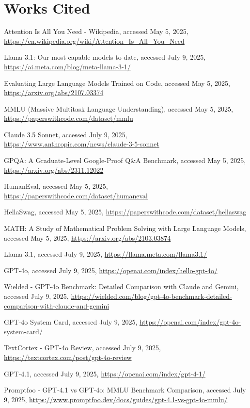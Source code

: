 \documentclass[12pt, a4paper]{article}
\begin{document}
\newpage
\section*{Works Cited}
\begin{enumerate}[label={[\arabic*]}]
    \item Attention Is All You Need - Wikipedia, accessed May 5, 2025, \url{https://en.wikipedia.org/wiki/Attention_Is_All_You_Need}
    \item Llama 3.1: Our most capable models to date, accessed July 9, 2025, \url{https://ai.meta.com/blog/meta-llama-3-1/}
    \item Evaluating Large Language Models Trained on Code, accessed May 5, 2025, \url{https://arxiv.org/abs/2107.03374}
    \item MMLU (Massive Multitask Language Understanding), accessed May 5, 2025, \url{https://paperswithcode.com/dataset/mmlu}
    \item Claude 3.5 Sonnet, accessed July 9, 2025, \url{https://www.anthropic.com/news/claude-3-5-sonnet}
    \item GPQA: A Graduate-Level Google-Proof Q\&A Benchmark, accessed May 5, 2025, \url{https://arxiv.org/abs/2311.12022}
    \item HumanEval, accessed May 5, 2025, \url{https://paperswithcode.com/dataset/humaneval}
    \item HellaSwag, accessed May 5, 2025, \url{https://paperswithcode.com/dataset/hellaswag}
    \item MATH: A Study of Mathematical Problem Solving with Large Language Models, accessed May 5, 2025, \url{https://arxiv.org/abs/2103.03874}
    \item Llama 3.1, accessed July 9, 2025, \url{https://llama.meta.com/llama3.1/}
    \item GPT-4o, accessed July 9, 2025, \url{https://openai.com/index/hello-gpt-4o/}
    \item Wielded - GPT-4o Benchmark: Detailed Comparison with Claude and Gemini, accessed July 9, 2025, \url{https://wielded.com/blog/gpt-4o-benchmark-detailed-comparison-with-claude-and-gemini}
    \item GPT-4o System Card, accessed July 9, 2025, \url{https://openai.com/index/gpt-4o-system-card/}
    \item TextCortex - GPT-4o Review, accessed July 9, 2025, \url{https://textcortex.com/post/gpt-4o-review}
    \item GPT-4.1, accessed July 9, 2025, \url{https://openai.com/index/gpt-4-1/}
    \item Promptfoo - GPT-4.1 vs GPT-4o: MMLU Benchmark Comparison, accessed July 9, 2025, \url{https://www.promptfoo.dev/docs/guides/gpt-4.1-vs-gpt-4o-mmlu/}

\end{enumerate}
\end{document}
